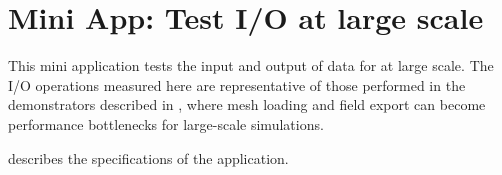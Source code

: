 
\section{Mini App: Test I/O at large scale}
\label{sec:app:specs:app-feelpp-io}

This mini application tests the input and output of data for \Feelpp at large scale.
The I/O operations measured here are representative of those performed in the demonstrators described in , where mesh loading and field export can become performance bottlenecks for large-scale simulations.

 describes the specifications of the application.

